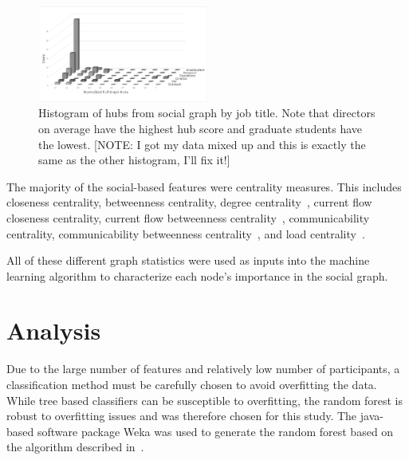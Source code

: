 \documentclass{article}
\begin{document}
\begin{figure}[H]
    \centering
        \includegraphics[width=0.5\textwidth]{Hubs_hist}
        \caption{Histogram of hubs from social graph by job title.  Note that directors on average have the highest hub score and graduate students have the lowest. [NOTE: I got my data mixed up and this is exactly the same as the other histogram, I'll fix it!]}
        \label{fig:social_ex_hist}
\end{figure}

The majority of the social-based features were centrality measures.  This includes closeness centrality, betweenness centrality, degree centrality~\cite{borgatti2011analyzing}, current flow closeness centrality, current flow betweenness centrality~\cite{brandes2005centrality}, communicability centrality, communicability betweenness centrality~\cite{estrada2008communicability}, and load centrality~\cite{newman2001scientific}.

All of these different graph statistics were used as inputs into the machine learning algorithm to characterize each node's importance in the social graph.


\section{Analysis} \label{Analysis}

Due to the large number of features and relatively low number of participants, a classification method must be carefully chosen to avoid overfitting the data.  While tree based classifiers can be susceptible to overfitting, the random forest is robust to overfitting issues and was therefore chosen for this study.  The java-based software package Weka was used to generate the random forest based on the algorithm described in~\cite{Breiman2001}.
\end{document}
